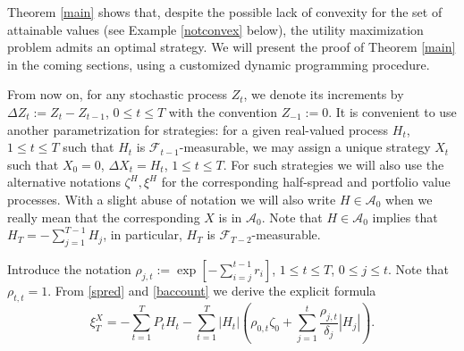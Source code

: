 \documentclass[a4paper]{article}
\begin{document}
Theorem \ref{main} shows that, despite the possible lack of convexity for the set of attainable values
(see Example \ref{notconvex} below), the utility maximization
problem admits an optimal strategy. We will present the proof of Theorem \ref{main} 
in the coming sections, using
a customized dynamic programming procedure.





From now on, for any stochastic process $Z_{t}$, we denote its increments by 
$\Delta Z_{t}:=Z_{t}-Z_{t-1}$, $0\leq t\leq T$ with the convention $Z_{-1}:=0$. 
It is convenient to use another parametrization for strategies: for a given real-valued
process $H_{t}$, $1\leq t\leq T$ such that $H_{t}$ is $\mathcal{F}_{t-1}$-measurable,
we may assign a unique strategy $X_{t}$ such that $X_{0}=0$, $\Delta X_{t}=H_{t}$, 
$1\leq t\leq T$. For such strategies we will also use the alternative notations 
$\zeta^{H},\xi^{H}$ for the corresponding half-spread and portfolio value processes.
With a slight abuse of notation we will also write $H\in \mathcal{A}_{0}$ when
we really mean that the corresponding $X$ is in $\mathcal{A}_{0}$. Note that $H\in\mathcal{A}_{0}$
implies that $H_{T}=-\sum_{j=1}^{T-1}H_{j}$, in particular, $H_{T}$ is $\mathcal{F}_{T-2}$-measurable.

Introduce the notation $\rho_{j,t}:=\exp\left[ -\sum_{i=j}^{t-1}r_{i}\right]$, $1\leq t\leq T$,
$0\leq j\leq t$. Note that $\rho_{t,t}=1$.
From \eqref{spred} and \eqref{baccount} we derive the explicit formula
\begin{equation}\label{expli}
\xi_{T}^{X}=-\sum_{t=1}^{T} P_{t}H_{t}
-\sum_{t=1}^{T} |H_{t}|\left( \rho_{0,t}\zeta_{0} +\sum_{j=1}^{t} 
\frac{\rho_{j,t}}{\delta_{j}}|H_{j}|\right).	
\end{equation}
\end{document}
